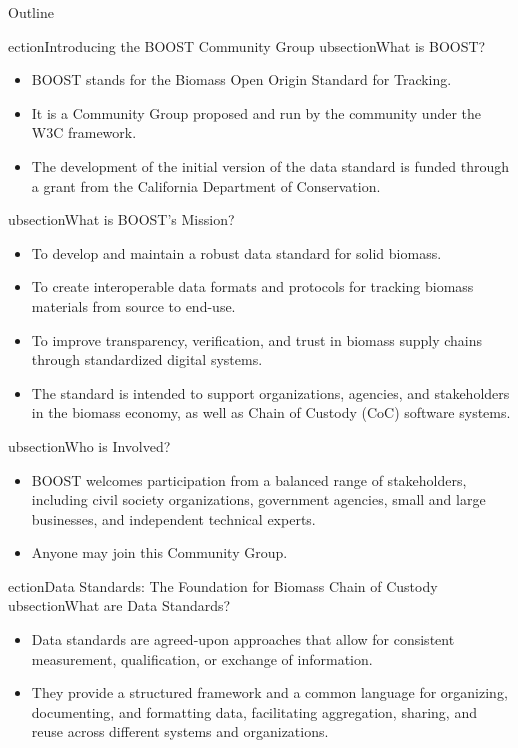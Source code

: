 \begin{frame}{Outline}
\tableofcontents
\end{frame}
 ection{Introducing the BOOST Community Group}
\label{sec:org1563742}
 ubsection{What is BOOST?}
\label{sec:orgaee8b65}
\begin{itemize}
\item BOOST stands for the Biomass Open Origin Standard for Tracking.
\item It is a Community Group proposed and run by the community under the W3C framework.
\item The development of the initial version of the data standard is funded through a grant from the California Department of Conservation.
\end{itemize}
 ubsection{What is BOOST's Mission?}
\label{sec:org5679d22}
\begin{itemize}
\item To develop and maintain a robust data standard for solid biomass.
\item To create interoperable data formats and protocols for tracking biomass materials from source to end-use.
\item To improve transparency, verification, and trust in biomass supply chains through standardized digital systems.
\item The standard is intended to support organizations, agencies, and stakeholders in the biomass economy, as well as Chain of Custody (CoC) software systems.
\end{itemize}
 ubsection{Who is Involved?}
\label{sec:org7373f0d}
\begin{itemize}
\item BOOST welcomes participation from a balanced range of stakeholders, including civil society organizations, government agencies, small and large businesses, and independent technical experts.
\item Anyone may join this Community Group.
\end{itemize}
 ection{Data Standards: The Foundation for Biomass Chain of Custody}
\label{sec:orga714174}
 ubsection{What are Data Standards?}
\label{sec:org629c6b9}
\begin{itemize}
\item Data standards are agreed-upon approaches that allow for consistent measurement, qualification, or exchange of information.
\item They provide a structured framework and a common language for organizing, documenting, and formatting data, facilitating aggregation, sharing, and reuse across different systems and organizations.
\end{itemize}
